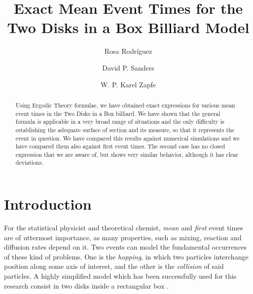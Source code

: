 \documentclass[letterpaper,10pt, jcp, aps]{revtex4-1}
\begin{document}
\title{Exact Mean Event Times for the Two Disks in a Box Billiard Model}

\author{Rosa Rodríguez}

\author{David P. Sanders}

\author{W. P. Karel Zapfe}


\begin{abstract}
Using Ergodic Theory formulae, we have obtained 
exact expressions for various  mean event times in the Two Disks in a Box
billiard.  We have shown that the general formula is applicable in a very broad range
of situations and the only difficulty is establishing the adequate surface
of section and its measure, so that it represents  the event in question. 
We have compared this results against
numerical simulations and we have compared them also against first event times.
The second case has no closed expression that we are aware of, but shows
very similar behavior, although it has clear deviations.   
\end{abstract}

\maketitle



\section{Introduction}


For the statistical physicist and theoretical
chemist, \emph{mean} and \emph{first} event
times are of uttermost importance, as many properties,
such as mixing, reaction and diffusion rates depend on it. 
Two events can model the fundamental occurrences of
these kind of problems. One is the \emph{hopping},
in which two particles interchange position along some
axis of interest, and the other
is the \emph{collision} of said particles. 
A highly simplified model which has been successfully  used for
this research consist in two disks inside a rectangular
box \cite{Awazu01, Munakata02, Suh05}.
\end{document}
